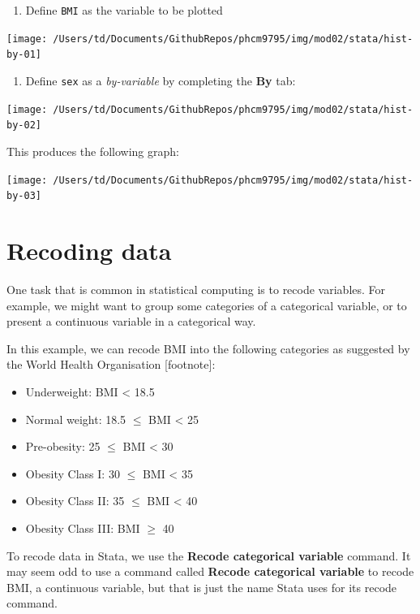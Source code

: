 \documentclass[
]{memoir}
\providecommand{\tightlist}{%
  \setlength{\itemsep}{0pt}\setlength{\parskip}{0pt}}
\begin{document}
\begin{enumerate}
\def\labelenumi{\arabic{enumi})}
\tightlist
\item
  Define \texttt{BMI} as the variable to be plotted
\end{enumerate}

\texttt{[image: /Users/td/Documents/GithubRepos/phcm9795/img/mod02/stata/hist-by-01]}

\begin{enumerate}
\def\labelenumi{\arabic{enumi})}
\setcounter{enumi}{1}
\tightlist
\item
  Define \texttt{sex} as a \emph{by-variable} by completing the \textbf{By} tab:
\end{enumerate}

\texttt{[image: /Users/td/Documents/GithubRepos/phcm9795/img/mod02/stata/hist-by-02]}

This produces the following graph:

\texttt{[image: /Users/td/Documents/GithubRepos/phcm9795/img/mod02/stata/hist-by-03]}

\hypertarget{recoding-data}{%
\section{Recoding data}\label{recoding-data}}

One task that is common in statistical computing is to recode variables. For example, we might want to group some categories of a categorical variable, or to present a continuous variable in a categorical way.

In this example, we can recode BMI into the following categories as suggested by the World Health Organisation {[}footnote{]}:

\begin{itemize}
\tightlist
\item
  Underweight: BMI \textless{} 18.5
\item
  Normal weight: 18.5 \(\le\) BMI \textless{} 25
\item
  Pre-obesity: 25 \(\le\) BMI \textless{} 30
\item
  Obesity Class I: 30 \(\le\) BMI \textless{} 35
\item
  Obesity Class II: 35 \(\le\) BMI \textless{} 40
\item
  Obesity Class III: BMI \(\ge\) 40
\end{itemize}

To recode data in Stata, we use the \textbf{Recode categorical variable} command. It may seem odd to use a command called \textbf{Recode categorical variable} to recode BMI, a continuous variable, but that is just the name Stata uses for its recode command.
\end{document}

